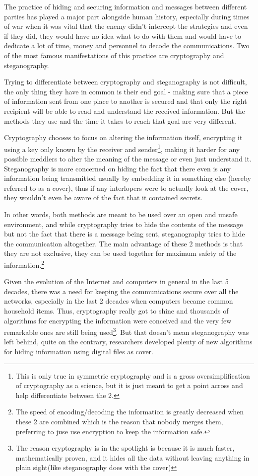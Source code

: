 \setlength\columnsep{20pt}
\begin{multicols*}{2}
The practice of hiding and securing information and messages between different parties has played a major part alongside human history, especially during times of war when it was vital that the enemy didn't intercept the strategies and even if they did, they would have no idea what to do with them and would have to dedicate a lot of time, money and personnel to decode the communications. Two of the most famous manifestations of this practice are cryptography and steganography\cite{steganography-history}.

Trying to differentiate between cryptography and steganography is not difficult, the only thing they have in common is their end goal - making sure that a piece of information sent from one place to another is secured and that only the right recipient will be able to read and understand the received information. But the methods they use and the time it takes to reach that goal are very different. 

Cryptography chooses to focus on altering the information itself, encrypting it using a key only known by the receiver and sender\footnote{This is only true in symmetric cryptography and is a gross oversimplification of cryptography as a science, but it is just meant to get a point across and help differentiate between the 2.}, making it harder for any possible meddlers to  alter the meaning of the message or even just understand it. Steganography is more concerned on hiding the fact that there even is any information being transmitted usually by embedding it in something else (hereby referred to as a cover), thus if any interlopers were to actually look at the cover, they wouldn't even be aware of the fact that it contained secrets.

In other words, both methods are meant to be used over an open and unsafe environment, and while cryptography tries to hide the contents of the message but not the fact that there is a message being sent, steganography tries to hide the communication altogether. The main advantage of these 2 methods is that they are not exclusive, they can be used together for maximum safety of the information.\footnote{The speed of encoding/decoding the information is greatly decreased when these 2 are combined which is the reason that nobody merges them, preferring to juse use encryption to keep the information safe.}

Given the evolution of the Internet and computers in general in the last 5 decades, there was a need for keeping the communications secure over all the networks, especially in the last 2 decades when computers became common household items. Thus, cryptography really got to shine and thousands of algorithms for encrypting the information were conceived and the very few remarkable ones are still being used\footnote{The reason cryptography is in the spotlight is because it is much faster, mathematically proven, and it hides all the data without leaving anything in plain sight(like steganography does with the cover)}.  But that doesn't mean steganography was left behind, quite on the contrary, researchers developed plenty of new algorithms for hiding information using digital files as cover.


\end{multicols*}
